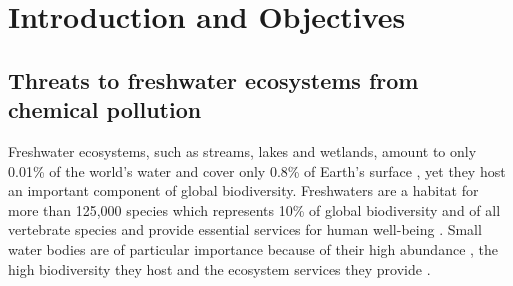 

\chapter{Introduction and Objectives}
\label{sec:introduction} 

\section[Threats to freshwater ecosystems from chemical pollution]{\texorpdfstring{Threats to freshwater ecosystems from \\ chemical pollution}{Threats to freshwater ecosystems from chemical pollution}}

Freshwater ecosystems, such as streams, lakes and wetlands, amount to only 0.01\% of the world's water and cover only 0.8\% of Earth's surface \citep{dudgeon_freshwater_2006, gleick_water_1996}, yet they host an important component of global biodiversity. 
Freshwaters are a habitat for more than 125,000 species which represents 10\% of global biodiversity and  of all vertebrate species \citep{balian_freshwater_2007,  strayer_freshwater_2010} and provide essential services for human well-being \citep{millennium_ecosystem_assessment_ecosystems_2005}. 
Small water bodies are of particular importance because of their high abundance \citep{downing_global_2012}, the high biodiversity they host \citep{davies_comparative_2008} and the ecosystem services they provide \citep{biggs_importance_2016}. 

